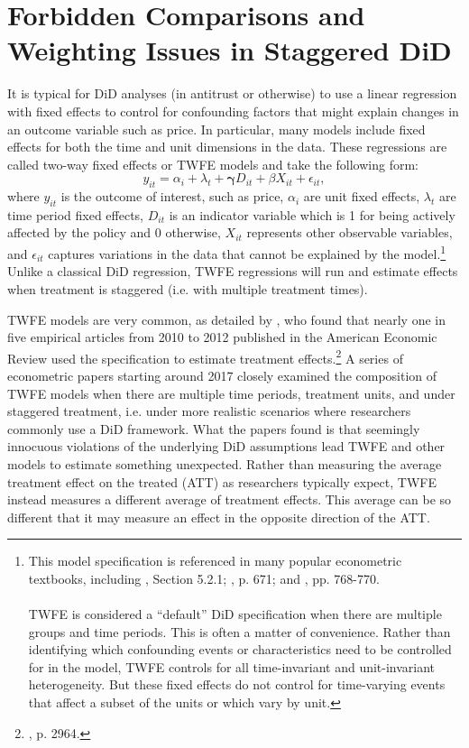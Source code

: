 \documentclass[12pt]{article}
\begin{document}
\section{Forbidden Comparisons and Weighting Issues in Staggered DiD} \label{sec:literature}
It is typical for DiD analyses (in antitrust or otherwise) to use a linear regression with fixed effects to control for confounding factors that might explain changes in an outcome variable such as price. In particular, many models include fixed effects for both the time and unit dimensions in the data. These regressions are called two-way fixed effects or TWFE models and take the following form:
\begin{equation}
    y_{it} = \alpha_i + \lambda_t + \boldsymbol{\gamma}  D_{it} + \beta X_{it} + \epsilon_{it},
\end{equation}
where $y_{it}$ is the outcome of interest, such as price, $\alpha_i$ are unit fixed effects, $\lambda_t$ are time period fixed effects, $D_{it}$ is an indicator variable which is 1 for being actively affected by the policy and 0 otherwise, $X_{it}$ represents other observable variables, and  $\epsilon_{it}$ captures variations in the data that cannot be explained by the model.\footnote{This model specification is referenced in many popular econometric textbooks, including  \citet{angrist2009mostly}, Section 5.2.1; \citet{hansen2022econometrics}, p. 671; and \citet{cameron2020}, pp. 768-770. \\\\ TWFE is considered a “default” DiD specification when there are multiple groups and time periods. This is often a matter of convenience. Rather than identifying which confounding events or characteristics need to be controlled for in the model, TWFE controls for all time-invariant and unit-invariant heterogeneity. But these fixed effects do not control for time-varying events that affect a subset of the units or which vary by unit.} Unlike a classical DiD regression, TWFE regressions will run and estimate effects when treatment is staggered (i.e. with multiple treatment times).

TWFE models are very common, as detailed by \citet{de2020two}, who found that nearly one in five empirical articles from 2010 to 2012 published in the American Economic Review used the specification to estimate treatment effects.\footnote{\citet{de2020two}, p. 2964.} A series of econometric papers starting around 2017 closely examined the composition of TWFE models when there are multiple time periods, treatment units, and under staggered treatment, i.e. under more realistic scenarios where researchers commonly use a DiD framework. What the papers found is that seemingly innocuous violations of the underlying DiD assumptions lead TWFE and other models to estimate something unexpected. Rather than measuring the average treatment effect on the treated (ATT) as researchers typically expect, TWFE instead measures a different average of treatment effects. This average can be so different that it may measure an effect in the opposite direction of the ATT.
\end{document}
